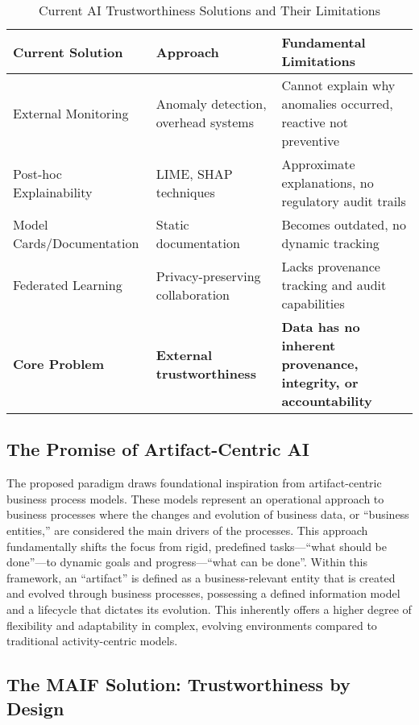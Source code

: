 \documentclass[conference]{IEEEtran}
\begin{document}
\begin{table*}[!t]
\renewcommand{\arraystretch}{1.3}
\caption{Current AI Trustworthiness Solutions and Their Limitations}
\label{tab:current-solutions-limitations}
\centering
\footnotesize
\begin{tabular}{p{3.5cm}p{5cm}p{5.5cm}}
\toprule
\textbf{Current Solution} & \textbf{Approach} & \textbf{Fundamental Limitations} \\
\midrule
External Monitoring & Anomaly detection, overhead systems & Cannot explain why anomalies occurred, reactive not preventive \\
Post-hoc Explainability & LIME, SHAP techniques & Approximate explanations, no regulatory audit trails \\
Model Cards/Documentation & Static documentation & Becomes outdated, no dynamic tracking \\
Federated Learning & Privacy-preserving collaboration & Lacks provenance tracking and audit capabilities \\
\textbf{Core Problem} & \textbf{External trustworthiness} & \textbf{Data has no inherent provenance, integrity, or accountability} \\
\bottomrule
\end{tabular}
\end{table*}

\subsection{The Promise of Artifact-Centric AI}

The proposed paradigm draws foundational inspiration from artifact-centric business process models. These models represent an operational approach to business processes where the changes and evolution of business data, or ``business entities,'' are considered the main drivers of the processes\cite{ref10}. This approach fundamentally shifts the focus from rigid, predefined tasks---``what should be done''---to dynamic goals and progress---``what can be done''\cite{ref12}. Within this framework, an ``artifact'' is defined as a business-relevant entity that is created and evolved through business processes, possessing a defined information model and a lifecycle that dictates its evolution\cite{ref12}. This inherently offers a higher degree of flexibility and adaptability in complex, evolving environments compared to traditional activity-centric models\cite{ref12}.


\subsection{The MAIF Solution: Trustworthiness by Design}
\end{document}
